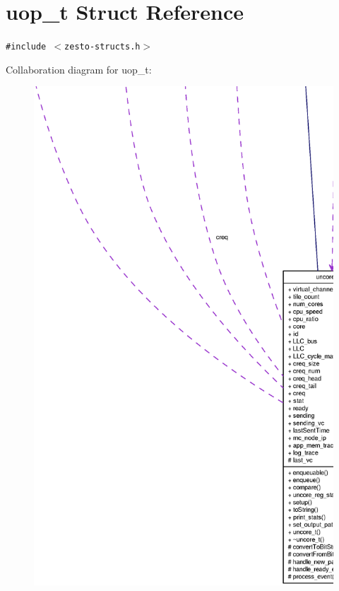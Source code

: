 \section{uop\_\-t Struct Reference}
\label{structuop__t}
{\tt \#include $<$zesto-structs.h$>$}

Collaboration diagram for uop\_\-t:\nopagebreak
\begin{figure}[H]
\begin{center}
\leavevmode
\includegraphics[width=400pt]{structuop__t__coll__graph}
\end{center}
\end{figure}
